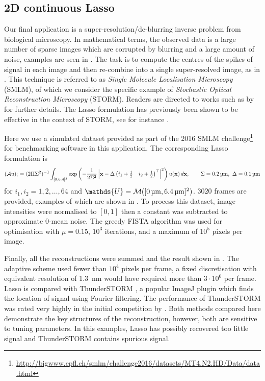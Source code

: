 \documentclass[10pt,a4paper,onecolumn]{article}
\numberwithin{equation}{section}
\let\F\mathds\let\C\mathcal\newcommand{\R}{\F{R}}\newcommand{\A}{\C{A}}
\renewcommand{\vec}{\mathbf}
\newcommand{\UCmath}[1]{%
	\begingroup
	\ucmathlist\uppercase\expandafter{#1}%
	\endgroup
}
\newcommand{\ucmathlist}{%
	\def\alpha{\mathrm{A}}%
	\def\beta{\mathrm{B}}%
	\let\gamma=\Gamma
	\let\delta=\Delta
	\def\epsilon{\mathrm{E}}%
	\def\varepsilon{\mathrm{E}}%
	\def\zeta{\mathrm{Z}}%
	\def\eta{\mathrm{H}}%
	\let\theta=\Theta
	\let\vartheta=\Theta
	\def\iota{\mathrm{I}}%
	\def\kappa{\mathrm{K}}%
	\let\lambda=\Lambda
	\def\mu{\mathrm{M}}%
	\def\nu{\mathrm{N}}%
	\let\xi=\Xi
	\let\pi=\Pi
	\let\varpi=\Pi
	\def\rho{\mathrm{P}}%
	\def\varrho{\mathrm{P}}%
	\let\sigma=\Sigma
	\def\tau{\mathrm{T}}%
	\let\upsilon=\Upsilon
	\let\phi=\Phi
	\let\varphi=\Phi
	\def\chi{\mathrm{X}}%
	\let\psi=\Psi
	\let\omega=\Omega
}
\newcommand{\caps}[1]{\UCmath{#1}}
\newcommand*{\varf}[1]{%
	\IfEqCase{#1}{%
		{0}{u}%
		{1}{v}%
		{2}{w}%
	}[u#1]%
}
\newcommand*{\spcf}[1]{%
	\IfEqCase{#1}{%
		{0}{\F{U}}%
		{1}{\F{V}}%
		{2}{\F{W}}%
	}[\F{U}#1]%
}
\newcommand*{\varx}[1]{%
	\IfEqCase{#1}{%
		{0}{x}%
		{1}{y}%
		{2}{z}%
		{3}{r}%
	}[x#1]%
}
\newcommand*{\Varx}[1]{\caps{\varx{#1}}}
\newcommand*{\vvarx}[1]{\vec{\varx{#1}}}\newcommand*{\vVarx}[1]{\vec{\Varx{#1}}}
\begin{document}
\subsection{2D continuous Lasso}
Our final application is a super-resolution/de-blurring inverse problem from biological microscopy. In mathematical terms, the observed data is a large number of sparse images which are corrupted by blurring and a large amount of noise, examples are seen in . The task is to compute the centres of the spikes of signal in each image and then re-combine into a single super-resolved image, as in . This technique is referred to as \emph{Single Molecule Localisation Microscopy} (SMLM), of which we consider the specific example of \emph{Stochastic Optical Reconstruction Microscopy} (STORM). Readers are directed to works such as by \citet{Sage2015,Sage2019,Schermelleh2019} for further details. The Lasso formulation has previously been shown to be effective in the context of STORM, see for instance \citet{Huang2017,Denoyelle2019}.

Here we use a simulated dataset provided as part of the 2016 SMLM challenge\footnote{\url{http://bigwww.epfl.ch/smlm/challenge2016/datasets/MT4.N2.HD/Data/data.html}} for benchmarking software in this application. The corresponding Lasso formulation is 
\begin{equation}
	(\A\varf0)_{i} = (2\pi\sigma^2)^{-1}\int_{[0,6.4]^2} \exp\left(-\frac{1}{2\sigma^2}\left|\vvarx0- \Delta\begin{pmatrix}i_1+\tfrac12 & i_2+\tfrac12\end{pmatrix}^\top \right|^2\right)\varf0(\vvarx0)\,d\vvarx0, \qquad \sigma=\SI{0.2}{\micro\meter},\ \Delta=\SI{0.1}{\micro\meter}
\end{equation}
for $i_1,i_2 = 1,2,\ldots,64$ and $\spcf0=\C M([\SI{0}{\micro\meter},\SI{6.4}{\micro\meter}]^2)$. 3020 frames are provided, examples of which are shown in . To process this dataset, image intensities were normalised to $[0,1]$ then a constant was subtracted to approximate 0-mean noise. The greedy FISTA algorithm was used for optimisation with $\mu=0.15$, $10^3$ iterations, and a maximum of $10^5$ pixels per image. 

Finally, all the reconstructions were summed and the result shown in . The adaptive scheme used fewer than $10^4$ pixels per frame, a fixed discretisation with equivalent resolution of \SI{1.3}{\nano\meter} would have required more than $3\cdot10^6$ per frame. Lasso is compared with ThunderSTORM \citep{Ovesny2014}, a popular ImageJ plugin \citep{Schindelin2012} which finds the location of signal using Fourier filtering. The performance of ThunderSTORM was rated very highly in the initial competition by \citet{Sage2015}. Both methods compared here demonstrate the key structures of the reconstruction, however, both are sensitive to tuning parameters. In this examples, Lasso has possibly recovered too little signal and ThunderSTORM contains spurious signal. 
\end{document}
